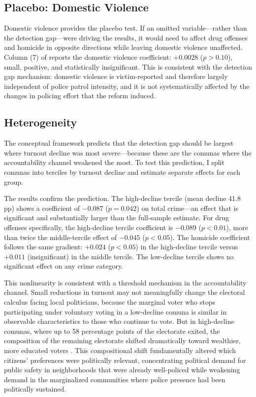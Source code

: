 \documentclass[12pt]{article}
\begin{document}
\subsection{Placebo: Domestic Violence}

Domestic violence provides the placebo test. If an omitted variable---rather than the detection gap---were driving the results, it would need to affect drug offenses and homicide in opposite directions while leaving domestic violence unaffected. Column (7) of  reports the domestic violence coefficient: $+0.0028$ ($p > 0.10$), small, positive, and statistically insignificant. This is consistent with the detection gap mechanism: domestic violence is victim-reported and therefore largely independent of police patrol intensity, and it is not systematically affected by the changes in policing effort that the reform induced.

\subsection{Heterogeneity}

The conceptual framework predicts that the detection gap should be largest where turnout decline was most severe---because these are the comunas where the accountability channel weakened the most. To test this prediction, I split comunas into terciles by turnout decline and estimate separate effects for each group.

The results confirm the prediction. The high-decline tercile (mean decline 41.8 pp) shows a coefficient of $-0.087$ ($p = 0.042$) on total crime---an effect that is significant and substantially larger than the full-sample estimate. For drug offenses specifically, the high-decline tercile coefficient is $-0.089$ ($p < 0.01$), more than twice the middle-tercile effect of $-0.045$ ($p < 0.05$). The homicide coefficient follows the same gradient: $+0.024$ ($p < 0.05$) in the high-decline tercile versus $+0.011$ (insignificant) in the middle tercile. The low-decline tercile shows no significant effect on any crime category.

This nonlinearity is consistent with a threshold mechanism in the accountability channel. Small reductions in turnout may not meaningfully change the electoral calculus facing local politicians, because the marginal voter who stops participating under voluntary voting in a low-decline comuna is similar in observable characteristics to those who continue to vote. But in high-decline comunas, where up to 58 percentage points of the electorate exited, the composition of the remaining electorate shifted dramatically toward wealthier, more educated voters \citep{Contreras2016}. This compositional shift fundamentally altered which citizens' preferences were politically relevant, concentrating political demand for public safety in neighborhoods that were already well-policed while weakening demand in the marginalized communities where police presence had been politically sustained.
\end{document}
